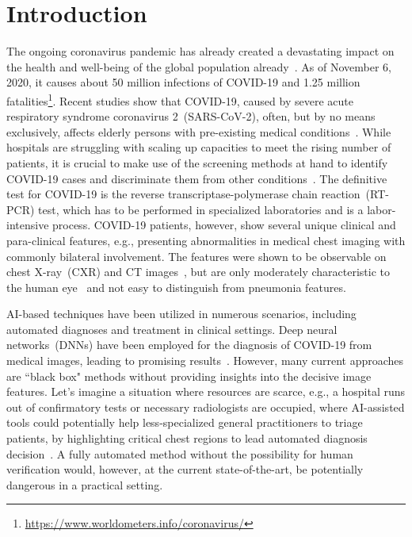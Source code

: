 \documentclass[conference]{IEEEtran}
\begin{document}
\section{Introduction}
\label{introduction}
The ongoing coronavirus pandemic%
has already created a devastating impact on the health and well-being of the global population already~\cite{wang2020covid,gozes2020rapid}. As of November 6, 2020, it causes about 50 million infections of COVID-19 and 1.25 million fatalities\footnote{\url{https://www.worldometers.info/coronavirus/}}. 
Recent studies show that COVID-19, caused by severe acute respiratory syndrome coronavirus 2~(SARS-CoV-2), often, but by no means exclusively, affects elderly persons with pre-existing medical conditions~\cite{COVID1,COVID2,COVID3,huang2020clinical,ng2020imaging}.
While hospitals are struggling with scaling up capacities to meet the rising number of patients, it is crucial to make use of the screening methods at hand to identify COVID-19 cases and discriminate them from other conditions~\cite{wang2020covid}. 
The definitive test for COVID-19 is the reverse transcriptase-polymerase chain reaction~(RT-PCR) test, which has to be performed in specialized laboratories and is a labor-intensive process. COVID-19 patients, however, show several unique clinical and para-clinical features, e.g., presenting abnormalities in medical chest imaging with commonly bilateral involvement. The features were shown to be observable on chest X-ray~(CXR) and CT images~\cite{huang2020clinical}, but are only moderately characteristic to the human eye~\cite{ng2020imaging} and not easy to distinguish from pneumonia features. 

AI-based techniques have been utilized in numerous scenarios, including automated diagnoses and treatment in clinical settings. Deep neural networks~(DNNs) have been employed for the diagnosis of COVID-19 from medical images, leading to promising results~\cite{huang2020clinical,wang2020covid,ng2020imaging,ozturk2020automated,tabik2020covidgr}. However, many current approaches are ``black box" methods without providing insights into the decisive image features. 
Let's imagine a situation where resources are scarce, e.g., a hospital runs out of confirmatory tests or necessary radiologists are occupied, where AI-assisted tools could potentially help less-specialized general practitioners to triage patients, by highlighting critical chest regions to lead automated diagnosis decision~\cite{wang2020covid}. A fully automated method without the possibility for human verification would, however, at the current state-of-the-art, be potentially dangerous in a practical setting. 
\end{document}
